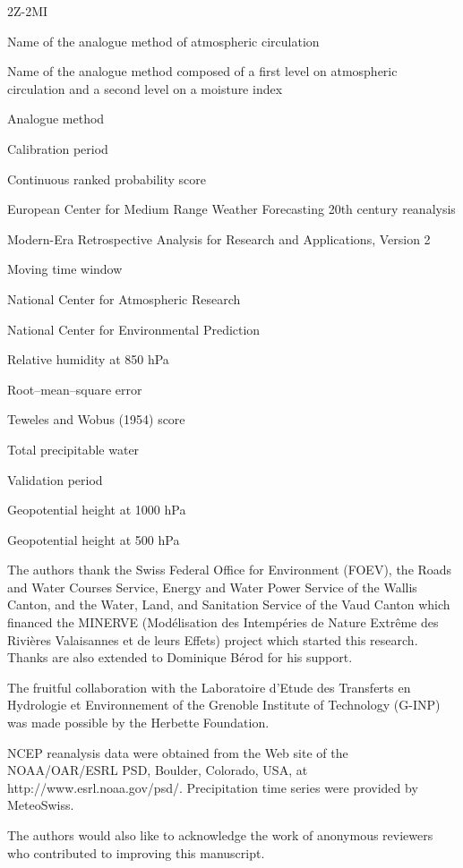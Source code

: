 \documentclass[hess, manuscript]{copernicus}
\begin{document}
	\begin{labeling}{2Z-2MI}
		\item [2Z] Name of the analogue method of atmospheric circulation
		\item [2Z-2MI] Name of the analogue method composed of a first level on atmospheric circulation and a second level on a moisture index
		\item [AM] Analogue method
		\item [CP] Calibration period
		\item [CRPS] Continuous ranked probability score
		\item [ERA-20C] European Center for Medium Range Weather Forecasting 20th century reanalysis
		\item [MERRA-2] Modern-Era Retrospective Analysis for Research and Applications, Version 2
		\item [MTW] Moving time window
		\item [NCAR] National Center for Atmospheric Research
		\item [NCEP] National Center for Environmental Prediction
		\item [RH850] Relative humidity at 850 hPa
		\item [RMSE] Root--mean--square error
		\item [S1] Teweles and Wobus (1954) score
		\item [TPW] Total precipitable water
		\item [VP] Validation period
		\item [Z1000] Geopotential height at 1000 hPa
		\item [Z500] Geopotential height at 500 hPa
	\end{labeling}
	
	
	
	
	
	\begin{acknowledgements}
		The authors thank the Swiss Federal Office for Environment (FOEV), the Roads and Water Courses Service, Energy and Water Power Service of the Wallis Canton, and the Water, Land, and Sanitation Service of the Vaud Canton which financed the MINERVE (Mod\'{e}lisation des Intemp\'{e}ries de Nature Extr\^{e}me des Rivi\`{e}res Valaisannes et de leurs Effets) project which started this research. Thanks are also extended to Dominique B\'{e}rod for his support.
		
		The fruitful collaboration with the Laboratoire d'Etude des Transferts en Hydrologie et Environnement of the Grenoble Institute of Technology (G-INP) was made possible by the Herbette Foundation. 
		
		NCEP reanalysis data were obtained from the Web site of the NOAA/OAR/ESRL PSD, Boulder, Colorado, USA, at http://www.esrl.noaa.gov/psd/. Precipitation time series were provided by MeteoSwiss.
		
		The authors would also like to acknowledge the work of anonymous reviewers who contributed to improving this manuscript. 
	\end{acknowledgements}
	
\end{document}
